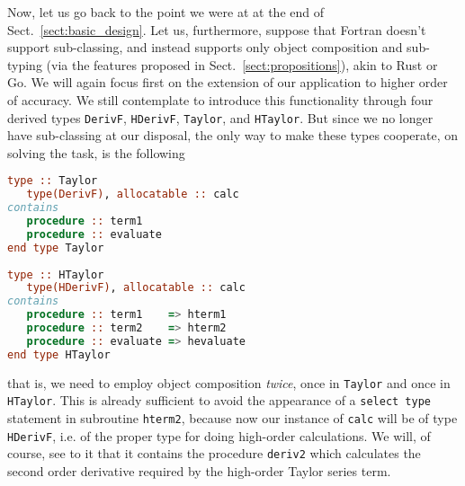 \documentclass[11pt,oneside]{article}
\begin{document}
Now, let us go back to the point we were at at the end of
Sect.~\ref{sect:basic_design}. Let us, furthermore, suppose that Fortran
doesn't support sub-classing, and instead supports only object
composition and sub-typing (via the features proposed in
Sect.~\ref{sect:propositions}), akin to Rust or Go. We will again
focus first on the extension of our application to higher order of
accuracy. We still contemplate to introduce this functionality through
four derived types \texttt{DerivF}, \texttt{HDerivF}, \texttt{Taylor},
and \texttt{HTaylor}. But since we no longer have sub-classing at
our disposal, the only way to make these types cooperate, on solving
the task, is the following
\begin{lstlisting}[language=Fortran]
type :: Taylor
   type(DerivF), allocatable :: calc
contains
   procedure :: term1
   procedure :: evaluate
end type Taylor
   
type :: HTaylor
   type(HDerivF), allocatable :: calc
contains
   procedure :: term1    => hterm1
   procedure :: term2    => hterm2
   procedure :: evaluate => hevaluate
end type HTaylor
\end{lstlisting}
that is, we need to employ object composition \emph{twice}, once in
\texttt{Taylor} and once in \texttt{HTaylor}. This is already
sufficient to avoid the appearance of a \texttt{select type} statement
in subroutine \texttt{hterm2}, because now our instance of
\texttt{calc} will be of type \texttt{HDerivF}, i.e. of the proper
type for doing high-order calculations. We will, of course, see to
it that it contains the procedure \texttt{deriv2} which calculates the
second order derivative required by the high-order Taylor series term.
\end{document}
